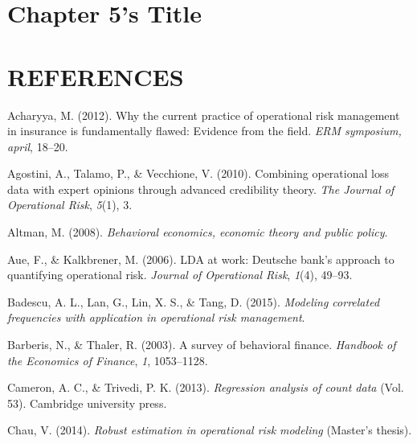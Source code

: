 \documentclass{DissertateUSU}
\begin{document}
\chapter{Chapter 5's Title}

\FloatBarrier
\newpage
{}
\fancyhead[R]{\thepage}
\fancyfoot[C]{}

\chapter*{REFERENCES}

\setlength{\parindent}{-0.5in}
\setlength{\leftskip}{0.4in}
\setlength{\parskip}{6pt}

\noindent

\hypertarget{refs}{}
\leavevmode\hypertarget{ref-acharyya2012current}{}%
Acharyya, M. (2012). Why the current practice of operational risk
management in insurance is fundamentally flawed: Evidence from the
field. \emph{ERM symposium, april}, 18--20.

\leavevmode\hypertarget{ref-agostini2010combining}{}%
Agostini, A., Talamo, P., \& Vecchione, V. (2010). Combining operational
loss data with expert opinions through advanced credibility theory.
\emph{The Journal of Operational Risk}, \emph{5}(1), 3.

\leavevmode\hypertarget{ref-altman2008behavioral}{}%
Altman, M. (2008). \emph{Behavioral economics, economic theory and
public policy}.

\leavevmode\hypertarget{ref-aue2006lda}{}%
Aue, F., \& Kalkbrener, M. (2006). LDA at work: Deutsche bank's approach
to quantifying operational risk. \emph{Journal of Operational Risk},
\emph{1}(4), 49--93.

\leavevmode\hypertarget{ref-badescu2015modeling}{}%
Badescu, A. L., Lan, G., Lin, X. S., \& Tang, D. (2015). \emph{Modeling
correlated frequencies with application in operational risk management}.

\leavevmode\hypertarget{ref-barberis2003survey}{}%
Barberis, N., \& Thaler, R. (2003). A survey of behavioral finance.
\emph{Handbook of the Economics of Finance}, \emph{1}, 1053--1128.

\leavevmode\hypertarget{ref-cameron2013regression}{}%
Cameron, A. C., \& Trivedi, P. K. (2013). \emph{Regression analysis of
count data} (Vol. 53). Cambridge university press.

\leavevmode\hypertarget{ref-chau2014robust}{}%
Chau, V. (2014). \emph{Robust estimation in operational risk modeling}
(Master's thesis).
\end{document}
